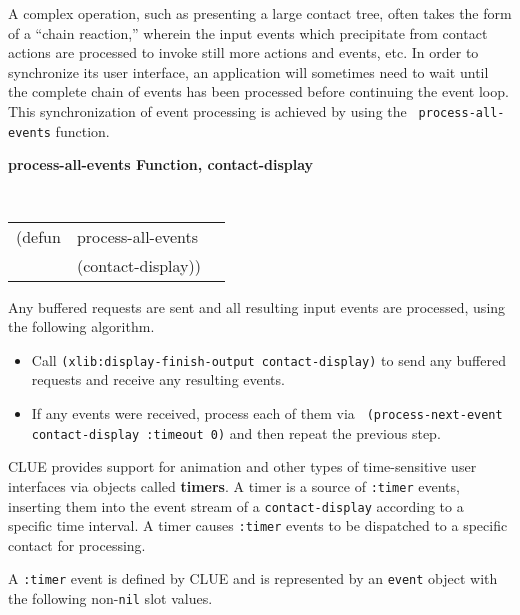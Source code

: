 \documentclass[twoside]{book}
\begin{document}
\begin{sloppy}
A complex operation, such as
presenting a large contact tree, often takes the form of a ``chain reaction,''
wherein the input events which precipitate from contact actions are processed to
invoke still more actions and events, etc. In order to synchronize its user
interface, an application will sometimes need to wait until the complete chain
of events has been processed before continuing the event loop.
This synchronization of event processing is achieved by using the {\tt
process-all-events} function.


{\samepage
{\large {\bf process-all-events \hfill Function, contact-display}}
\begin{flushright} \parbox[t]{6.125in}{
\tt
\begin{tabular}{lll}
\raggedright
(defun & process-all-events & \\ 
& (contact-display))
\end{tabular}
\rm

}\end{flushright}}


\begin{flushright} \parbox[t]{6.125in}{
Any buffered requests are sent and all resulting input events are processed,
using the following algorithm.
\begin{itemize}
\item Call {\tt (xlib:display-finish-output contact-display)} to send any
buffered requests and receive any resulting events.
\item If any events were received, process each of them via {\tt
(process-next-event contact-display :timeout 0)} and then repeat the previous
step. \end{itemize}

}\end{flushright}


CLUE provides support for animation and other types of
time-sensitive user interfaces via objects 
called {\bf timers}.
A timer is a source of {\tt :timer} events, inserting them into the event stream
of a {\tt contact-display} according to a specific time interval. A timer causes
{\tt :timer} events to be dispatched to a specific contact for processing.

A {\tt :timer} event is
defined by CLUE and is represented by an {\tt event} object with the following
non-{\tt nil} slot values.


\end{sloppy}
\end{document}
